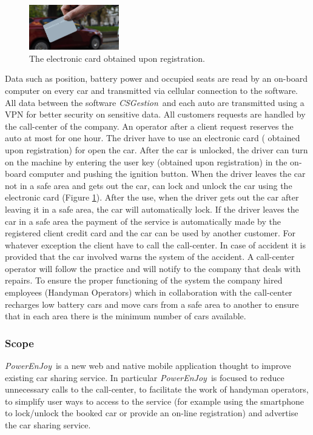 \documentclass{article}
\newcommand{\pej}{\mbox{\normalfont\itshape PowerEnJoy }}
\newcommand{\csg}{\mbox{\normalfont\itshape CSGestion }}
\begin{document}
		\begin{figure}
			\centering
			\includegraphics[width=0.35\textwidth]{"img/eletronic-card"}
			\caption{\label{fig:eletronic-card} The electronic card obtained upon registration.}
		\end{figure}
		Data such as position, battery power and occupied seats are read by an on-board computer on every car and transmitted via cellular connection to the software. All data between the software \csg and each auto are transmitted using a VPN for better security on sensitive data.
		All customers requests are handled by the call-center of the company. An operator after a client request reserves the auto at most for one hour. The driver have to use an electronic card (
		obtained upon registration) for open the car. After the car is unlocked, the driver can turn on the machine by entering the user key (obtained upon registration) in the on-board computer and pushing the ignition button.
		When the driver leaves the car not in a safe area and gets out the car, can lock and unlock the car using the electronic card (Figure \ref{fig:eletronic-card}).
		After the use, when the driver gets out the car after leaving it in a safe area, the car will automatically lock.
		If the driver leaves the car in a safe area the payment of the service is automatically made by the registered client credit card and the car can be used by another customer.
		For whatever exception the client have to call the call-center.
		In case of accident it is provided that the car involved warns the system of the accident.
		A call-center operator will follow the practice and will notify to the company that deals with repairs.
		To ensure the proper functioning of the system the company hired employees (Handyman Operators) which in collaboration with the call-center recharges low battery cars and move cars from a safe area to another to ensure that in each area there is the minimum number of cars available.
			
		\subsubsection{Scope} \label{sec:scope}
		\pej is a new web and native mobile application thought to improve existing car sharing service. In particular \pej is focused to reduce unnecessary calls to the call-center, to facilitate the work of handyman operators, to simplify user ways to access to the service (for example using the smartphone to lock/unlock the booked car or provide an on-line registration) and advertise the car sharing service.
		\pagebreak
	
\end{document}
